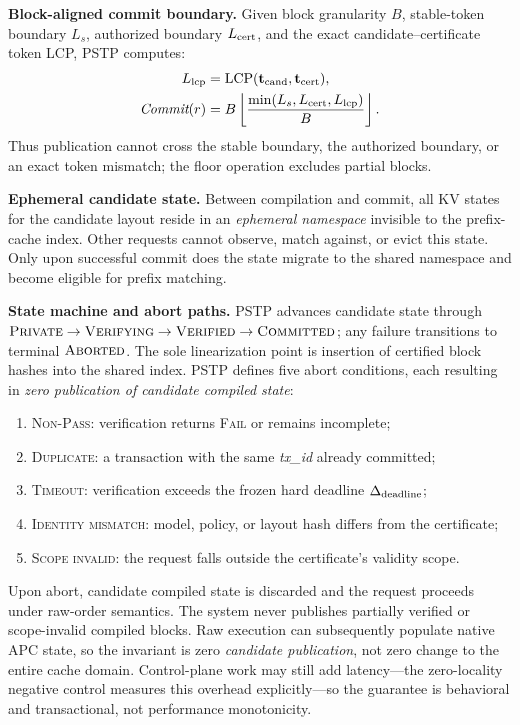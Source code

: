 \documentclass[journal]{IEEEtran}
\begin{document}
\smallskip
\noindent\textbf{Block-aligned commit boundary.}
Given block granularity $B$, stable-token boundary $L_s$, authorized boundary $L_{\rm cert}$, and the exact candidate--certificate token LCP, PSTP computes:
\begin{equation}
\begin{aligned}
  L_{\rm lcp}&=\operatorname{LCP}(\mathbf{t}_{\rm cand},\mathbf{t}_{\rm cert}),\\
  \textit{Commit}(r)&=B\left\lfloor\frac{\min(L_s,L_{\rm cert},L_{\rm lcp})}{B}\right\rfloor.
\end{aligned}
  \label{eq:commit}
\end{equation}
Thus publication cannot cross the stable boundary, the authorized boundary, or an exact token mismatch; the floor operation excludes partial blocks.

\smallskip
\noindent\textbf{Ephemeral candidate state.}
Between compilation and commit, all KV states for the candidate layout reside in an \emph{ephemeral namespace} invisible to the prefix-cache index. Other requests cannot observe, match against, or evict this state. Only upon successful commit does the state migrate to the shared namespace and become eligible for prefix matching.

\smallskip
\noindent\textbf{State machine and abort paths.}
PSTP advances candidate state through $\textsc{Private}\rightarrow\textsc{Verifying}\rightarrow\textsc{Verified}\rightarrow\textsc{Committed}$; any failure transitions to terminal $\textsc{Aborted}$. The sole linearization point is insertion of certified block hashes into the shared index. PSTP defines five abort conditions, each resulting in \emph{zero publication of candidate compiled state}:
\begin{enumerate}
  \item \textsc{Non-Pass}: verification returns \textsc{Fail} or remains incomplete;
  \item \textsc{Duplicate}: a transaction with the same \textit{tx\_id} already committed;
  \item \textsc{Timeout}: verification exceeds the frozen hard deadline $\Delta_{\rm deadline}$;
  \item \textsc{Identity mismatch}: model, policy, or layout hash differs from the certificate;
  \item \textsc{Scope invalid}: the request falls outside the certificate's validity scope.
\end{enumerate}

\noindent Upon abort, candidate compiled state is discarded and the request proceeds under raw-order semantics. The system never publishes partially verified or scope-invalid compiled blocks. Raw execution can subsequently populate native APC state, so the invariant is zero \emph{candidate publication}, not zero change to the entire cache domain. Control-plane work may still add latency---the zero-locality negative control measures this overhead explicitly---so the guarantee is behavioral and transactional, not performance monotonicity.
\end{document}
